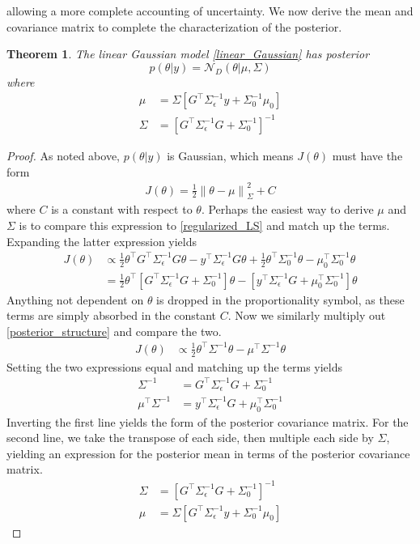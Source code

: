 \documentclass[12pt]{article}
\newcommand*{\norm}[1]{\left\lVert#1\right\rVert}
\newtheorem{thm}{Theorem}
\begin{document}
allowing a more complete accounting of uncertainty. We now derive the mean and covariance matrix to complete the characterization of the posterior. 
\begin{thm}
The linear Gaussian model \ref{linear_Gaussian} has posterior 
\[p(\theta|y) = \mathcal{N}_D(\theta|\mu, \Sigma)\]
where 
\begin{align} 
\mu &= \Sigma \left[G^{\top} \Sigma_{\epsilon}^{-1}y + \Sigma_0^{-1} \mu_0 \right] \\
\Sigma &= \left[G^{\top} \Sigma_{\epsilon}^{-1} G + \Sigma_0^{-1} \right]^{-1}
\end{align}
\end{thm}
\begin{proof} 
As noted above, $p(\theta|y)$ is Gaussian, which means $J(\theta)$ must have the form 
\begin{align}
J(\theta) = \frac{1}{2} \norm{\theta - \mu}^2_{\Sigma} + C \label{posterior_structure}
\end{align}
where $C$ is a constant with respect to $\theta$. Perhaps the easiest way to derive $\mu$ and $\Sigma$ is to compare this expression to \ref{regularized_LS} and match up the terms. 
Expanding the latter expression yields 
\begin{align*}
J(\theta) &\propto \frac{1}{2} \theta^{\top} G^{\top} \Sigma_{\epsilon}^{-1} G\theta - y^{\top} \Sigma_{\epsilon}^{-1} G\theta + \frac{1}{2} \theta^{\top} \Sigma_0^{-1} \theta - \mu_0^{\top} \Sigma_0^{-1} \theta \\ 
&= \frac{1}{2} \theta^{\top} \left[G^{\top} \Sigma_\epsilon^{-1} G + \Sigma_0^{-1} \right] \theta - \left[y^{\top} \Sigma_{\epsilon}^{-1} G + \mu_0^{\top} \Sigma_0^{-1} \right] \theta
\end{align*}
Anything not dependent on $\theta$ is dropped in the proportionality symbol, as these terms are simply absorbed in the constant $C$.  
Now we similarly multiply out \ref{posterior_structure} and compare the two. 
\begin{align*}
J(\theta) &\propto \frac{1}{2} \theta^{\top} \Sigma^{-1} \theta - \mu^{\top} \Sigma^{-1} \theta
\end{align*}
Setting the two expressions equal and matching up the terms yields
\begin{align*}
\Sigma^{-1} &= G^{\top} \Sigma_{\epsilon}^{-1} G + \Sigma_0^{-1} \\
\mu^{\top} \Sigma^{-1} &= y^{\top} \Sigma_{\epsilon}^{-1} G + \mu_0^{\top} \Sigma_0^{-1}
\end{align*}
Inverting the first line yields the form of the posterior covariance matrix. For the second line, we take the transpose of each side, then multiple 
each side by $\Sigma$, yielding an expression for the posterior mean in terms of the posterior covariance matrix. 
\begin{align*}
\Sigma &= \left[G^{\top} \Sigma_{\epsilon}^{-1} G + \Sigma_0^{-1} \right]^{-1} \\
\mu &= \Sigma \left[G^{\top} \Sigma_{\epsilon}^{-1}y + \Sigma_0^{-1} \mu_0 \right]
\end{align*}

\end{proof} 
\end{document}

